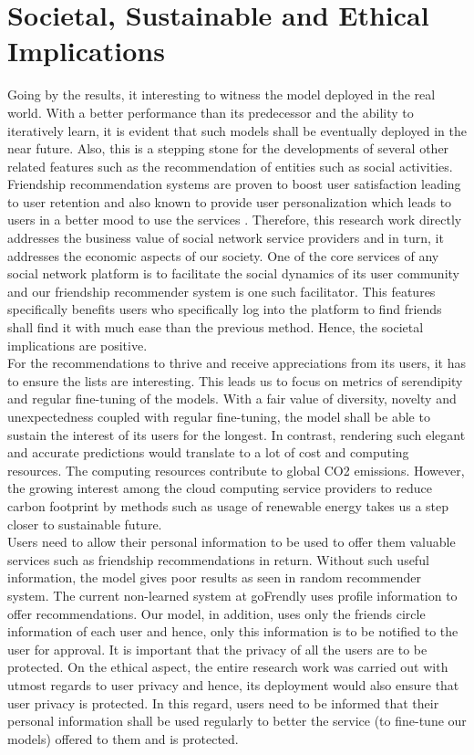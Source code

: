 \documentclass{kththesis}
\begin{document}
\section{Societal, Sustainable and Ethical Implications}
Going by the results, it interesting to witness the model deployed in the real world. With a better performance than its predecessor and the ability to iteratively learn, it is evident that such models shall be eventually deployed in the near future. Also, this is a stepping stone for the developments of several other related features such as the recommendation of entities such as social activities. \\

Friendship recommendation systems are proven to boost user satisfaction leading to user retention and also known to provide user personalization which leads to users in a better mood to use the services  \cite{bval}. Therefore, this research work directly addresses the business value of social network service providers and in turn, it addresses the economic aspects of our society. One of the core services of any social network platform is to facilitate the social dynamics of its user community and our friendship recommender system is one such facilitator. This features specifically benefits users who specifically log into the platform to find friends shall find it with much ease than the previous method. Hence, the societal implications are positive.\\

For the recommendations to thrive and receive appreciations from its users, it has to ensure the lists are interesting. This leads us to focus on metrics of serendipity and regular fine-tuning of the models. With a fair value of diversity, novelty and unexpectedness coupled with regular fine-tuning, the model shall be able to sustain the interest of its users for the longest. In contrast, rendering such elegant and accurate predictions would translate to a lot of cost and computing resources. The computing resources contribute to global CO2 emissions. However, the growing interest among the cloud computing service providers to reduce carbon footprint by methods such as usage of renewable energy takes us a step closer to sustainable future.\\

Users need to allow their personal information to be used to offer them valuable services such as friendship recommendations in return. Without such useful information, the model gives poor results as seen in random recommender system. The current non-learned system at goFrendly uses profile information to offer recommendations. Our model, in addition, uses only the friends circle information of each user and hence, only this information is to be notified to the user for approval. It is important that the privacy of all the users are to be protected. On the ethical aspect, the entire research work was carried out with utmost regards to user privacy and hence, its deployment would also ensure that user privacy is protected. In this regard, users need to be informed that their personal information shall be used regularly to better the service (to fine-tune our models) offered to them and is protected.
\end{document}
